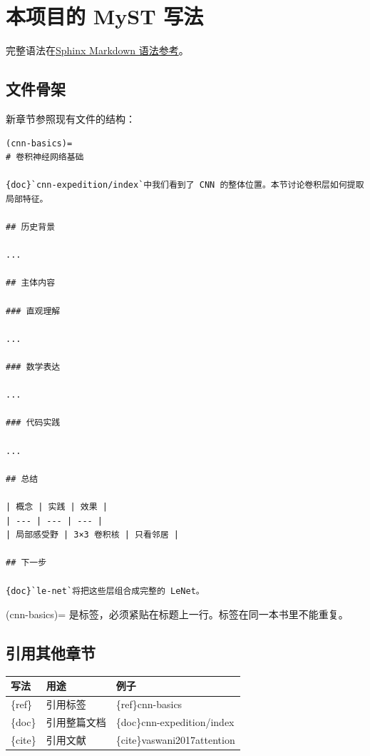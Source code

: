 \documentclass[UTF8,fontset=none,a4paper,11pt]{ctexart}
\newcommand{\code}[1]{{\CJKsetecglue{}\ttfamily #1}}
\newcommand{\bk}{\textasciigrave}
\begin{document}
\clearpage

\section{本项目的 MyST 写法}\label{sec:myst-syntax}

完整语法在\href{https://github.com/ulink-deep-learning-club/ulink-deeplearningclub-handouts/blob/main/source/appendix/sphinx-guide/index.md}{Sphinx Markdown 语法参考}。

\subsection{文件骨架}\label{sec:file-skeleton}

新章节参照现有文件的结构：

\begin{lstlisting}
(cnn-basics)=
# 卷积神经网络基础

{doc}`cnn-expedition/index`中我们看到了 CNN 的整体位置。本节讨论卷积层如何提取局部特征。

## 历史背景

...

## 主体内容

### 直观理解

...

### 数学表达

...

### 代码实践

...

## 总结

| 概念 | 实践 | 效果 |
| --- | --- | --- |
| 局部感受野 | 3×3 卷积核 | 只看邻居 |

## 下一步

{doc}`le-net`将把这些层组合成完整的 LeNet。
\end{lstlisting}

\code{(cnn-basics)=} 是标签，必须紧贴在标题上一行。标签在同一本书里不能重复。

\subsection{引用其他章节}\label{sec:cross-ref-syntax}

\begin{center}
\small
\begin{tabularx}{\linewidth}{@{}L{2.4cm}L{4.0cm}Y@{}}
\toprule
写法 & 用途 & 例子 \\
\midrule
\code{\{ref\}} & 引用标签 & \code{\{ref\}\bk cnn-basics\bk} \\
\code{\{doc\}} & 引用整篇文档 & \code{\{doc\}\bk cnn-expedition/index\bk} \\
\code{\{cite\}} & 引用文献 & \code{\{cite\}\bk vaswani2017attention\bk} \\
\bottomrule
\end{tabularx}
\end{center}
\end{document}
